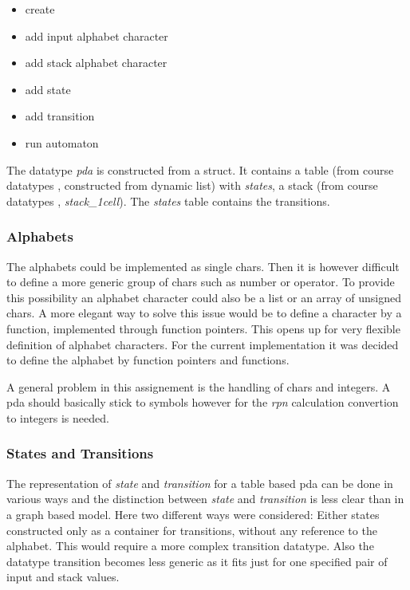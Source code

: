 \documentclass[a4paper,11pt,twoside]{article}
\begin{document}
\begin{itemize}
\item create
\item add input alphabet character
\item add stack alphabet character
\item add state
\item add transition
\item run automaton
\end{itemize}

The datatype \textit{pda} is constructed from a struct. It contains a
table (from course datatypes \cite{datatypes}, constructed from
dynamic list) with \textit{states}, a stack (from course datatypes
\cite{datatypes}, \textit{stack\_1cell}). The \textit{states} table contains
the transitions.

\subsubsection{Alphabets}
The alphabets could be implemented as single chars. Then it is however
difficult to define a more generic group of chars such as number or
operator. To provide this possibility an alphabet character could also
be a list or an array of unsigned chars. A more elegant way to
solve this issue would be to define a character by a function,
implemented through function pointers. This opens up for very flexible
definition of alphabet characters. For the current implementation it
was decided to define the alphabet by function pointers and functions.

A general problem in this assignement is the handling of chars and
integers. A pda should basically stick to symbols however for the \textit{rpn}
calculation convertion to integers is needed. 

\subsubsection{States and Transitions}
The representation of \textit{state} and \textit{transition} for
a table based pda can be done in various ways and the distinction
between \textit{state} and \textit{transition} is less clear than in a
graph based model. Here two different ways were considered: Either
states constructed only as a container for transitions, without any 
reference to the alphabet. This would require a more complex
transition datatype. Also the datatype transition becomes less generic
as it fits just for one specified pair of input and stack values.
\end{document}
